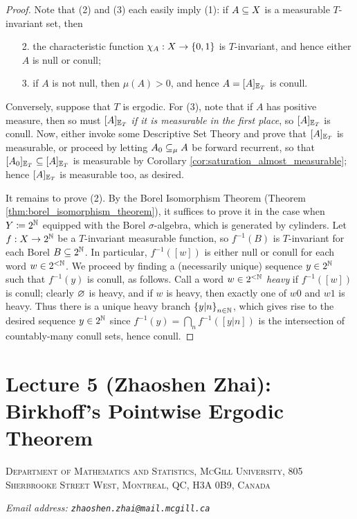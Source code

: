 \documentclass[reqno, twoside]{article}
\begin{document}
    \begin{proof}
        Note that (2) and (3) each easily imply (1): if $A\subseteq X$ is a measurable $T$-invariant set, then
        \begin{enumerate}
            \item[2.] the characteristic function $\chi_A:X\to\left\{0,1\right\}$ is $T$-invariant, and hence either $A$ is null or conull;
                \vspace{-0.05in}
            \item[3.] if $A$ is not null, then $\mu(A)>0$, and hence $A=[A]_{\mathbb{E}_T}$ is conull.
        \end{enumerate}
        Conversely, suppose that $T$ is ergodic. For (3), note that if $A$ has positive measure, then so must $[A]_{\mathbb{E}_T}$ \textit{if it is measurable in the first place}, so $[A]_{\mathbb{E}_T}$ is conull. Now, either invoke some Descriptive Set Theory and prove that $[A]_{\mathbb{E}_T}$ is measurable, or proceed by letting $A_0\subseteq_\mu A$ be forward recurrent, so that $[A_0]_{\mathbb{E}_T}\subseteq[A]_{\mathbb{E}_T}$ is measurable by Corollary \ref{cor:saturation_almost_measurable}; hence $[A]_{\mathbb{E}_T}$ is measurable too, as desired.

        It remains to prove (2). By the Borel Isomorphism Theorem (Theorem \ref{thm:borel_isomorphism_theorem}), it suffices to prove it in the case when $Y\coloneqq2^{\mathbb{N}}$ equipped with the Borel $\sigma$-algebra, which is generated by cylinders. Let $f:X\to2^{\mathbb{N}}$ be a $T$-invariant measurable function, so $f^{-1}(B)$ is $T$-invariant for each Borel $B\subseteq2^{\mathbb{N}}$. In particular, $f^{-1}([w])$ is either null or conull for each word $w\in2^{<\mathbb{N}}$. We proceed by finding a (necessarily unique) sequence $y\in2^{\mathbb{N}}$ such that $f^{-1}(y)$ is conull, as follows. Call a word $w\in2^{<\mathbb{N}}$ \textit{heavy} if $f^{-1}([w])$ is conull; clearly $\varnothing$ is heavy, and if $w$ is heavy, then exactly one of $w0$ and $w1$ is heavy. Thus there is a unique heavy branch $\left\{y|n\right\}_{n\in\mathbb{N}}$, which gives rise to the desired sequence $y\in2^{\mathbb{N}}$ since $f^{-1}(y)=\bigcap_nf^{-1}([y|n])$ is the intersection of countably-many conull sets, hence conull.
    \end{proof}

    \section{Lecture 5 (Zhaoshen Zhai): Birkhoff's Pointwise Ergodic Theorem}\label{sec:5}

    \begin{theorem}\label{thm:pointwise_ergodic_theorem}
        \TODO
    \end{theorem}

    \printbibliography

    {\footnotesize
        \textsc{Department of Mathematics and Statistics, McGill University, 805 Sherbrooke Street West, Montreal, QC, H3A 0B9, Canada}

        \textit{Email address: \tt{zhaoshen.zhai@mail.mcgill.ca}}
    }
\end{document}
